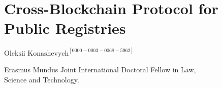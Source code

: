 \chapter{Cross-Blockchain Protocol for Public Registries}

\begin{center}
{\large\uppercase{$\text{Oleksii Konashevych}^{[0000-0003-0068-5962]}$}} 

Erasmus Mundus Joint International Doctoral Fellow in Law,\\ Science and Technology. 

\vskip -6pt

\end{center}

\vskip 2cm




\vfill




\newpage

